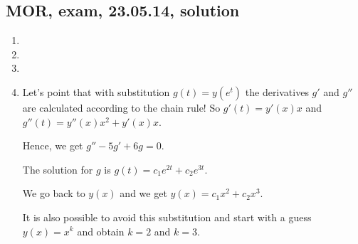 \subsection{MOR, exam, 23.05.14, solution}

\begin{enumerate}
\item 
\item 
\item 
\item Let's point that with substitution $g(t) = y(e^t)$ the derivatives $g'$ and $g''$ are calculated according to the chain rule!
So $g'(t) = y'(x)x$ and $g''(t) = y''(x)x^2 + y'(x) x$.

Hence, we get $g'' - 5g' + 6g=0$.

The solution for $g$ is $g(t) = c_1 e^{2t} + c_2 e^{3t}$.

We go back to $y(x)$ and we get $y(x) = c_1 x^2 + c_2 x^3$.

It is also possible to avoid this substitution and start with a guess $y(x) = x^k$ and obtain $k=2$ and $k=3$.


\end{enumerate}

